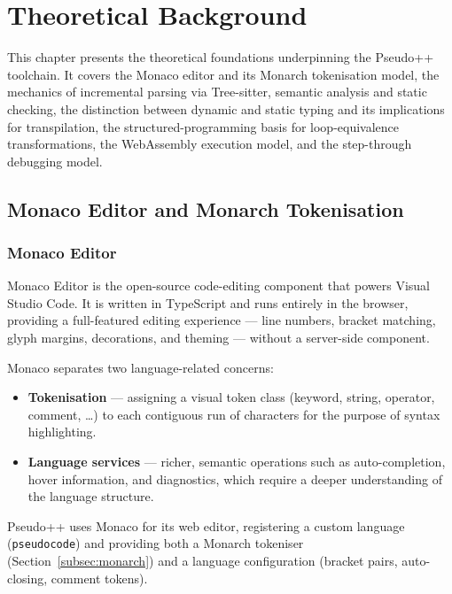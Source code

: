 \chapter{Theoretical Background}
\label{chap:background}

This chapter presents the theoretical foundations underpinning the Pseudo++ toolchain.
It covers the Monaco editor and its Monarch tokenisation model, the mechanics of
incremental parsing via Tree-sitter, semantic analysis and static checking, the
distinction between dynamic and static typing and its implications for transpilation,
the structured-programming basis for loop-equivalence transformations, the WebAssembly
execution model, and the step-through debugging model.

\section{Monaco Editor and Monarch Tokenisation}
\label{sec:monaco-monarch}

\subsection{Monaco Editor}

Monaco Editor \cite{monaco} is the open-source code-editing component that powers
Visual Studio Code.  It is written in TypeScript and runs entirely in the browser,
providing a full-featured editing experience --- line numbers, bracket matching, glyph
margins, decorations, and theming --- without a server-side component.

Monaco separates two language-related concerns:

\begin{itemize}
  \item \textbf{Tokenisation} --- assigning a visual token class (keyword, string,
        operator, comment, \ldots) to each contiguous run of characters for the
        purpose of syntax highlighting.
  \item \textbf{Language services} --- richer, semantic operations such as
        auto-completion, hover information, and diagnostics, which require a deeper
        understanding of the language structure.
\end{itemize}

Pseudo++ uses Monaco for its web editor, registering a custom language
(\texttt{pseudocode}) and providing both a Monarch tokeniser (Section~\ref{subsec:monarch})
and a language configuration (bracket pairs, auto-closing, comment tokens).

